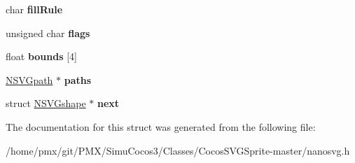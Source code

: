 \begin{DoxyCompactItemize}
char {\bfseries fill\+Rule}
\item 
\mbox{\label{structNSVGshape_a9aa4edfee40c4a3558bb34af06de4943}} 
unsigned char {\bfseries flags}
\item 
\mbox{\label{structNSVGshape_ac2028ddd1fea689f3e91c1be1c56901c}} 
float {\bfseries bounds} \mbox{[}4\mbox{]}
\item 
\mbox{\label{structNSVGshape_abb20153d943d5dc25a64763ae6d41eed}} 
\hyperlink{structNSVGpath}{N\+S\+V\+Gpath} $\ast$ {\bfseries paths}
\item 
\mbox{\label{structNSVGshape_a0bfd45ea4b53be0696a8472b593586f2}} 
struct \hyperlink{structNSVGshape}{N\+S\+V\+Gshape} $\ast$ {\bfseries next}
\end{DoxyCompactItemize}


The documentation for this struct was generated from the following file\+:\begin{DoxyCompactItemize}
\item 
/home/pmx/git/\+P\+M\+X/\+Simu\+Cocos3/\+Classes/\+Cocos\+S\+V\+G\+Sprite-\/master/nanosvg.\+h\end{DoxyCompactItemize}
